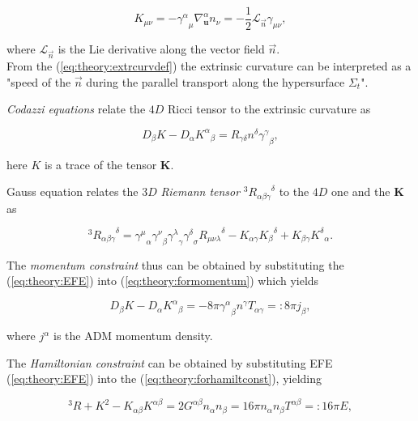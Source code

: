 \begin{equation}
K_{\mu\nu} = -{\gamma^{\alpha}}_{\mu}\nabla_{\boldsymbol{u}}^{\alpha} n_{\nu} = -\frac{1}{2}\mathcal{L}_{\vec{n}}\gamma_{\mu\nu},
\label{eq:theory:extrcurvdef}
\end{equation}

where $\mathcal{L}_{\vec{n}}$ is the Lie derivative along the vector field $\vec{n}$. \\
From the (\ref{eq:theory:extrcurvdef}) the extrinsic curvature can be interpreted as a "speed of the $\vec{n}$ during the parallel transport along the hypersurface $\Sigma_t$".

\textit{Codazzi equations} relate the $4D$ Ricci tensor to the extrinsic curvature as

\begin{equation}
D_{\beta}K-D_{\alpha}{K^{\alpha}}_{\beta}=R_{\gamma\delta}n^{\delta}{\gamma^{\gamma}}_{\beta},
\label{eq:theory:formomentum}
\end{equation}

here $K$ is a trace of the tensor $\boldsymbol{K}$.

Gauss equation relates the $3D$ \textit{Riemann tensor} $^3{R_{\alpha\beta\gamma}}^{\delta}$ to the $4D$ one and the $\boldsymbol{K}$ as 

\begin{equation}
^3{R_{\alpha\beta\gamma}}^{\delta} = {\gamma^{\mu}}_{\alpha}{\gamma^{\nu}}_{\beta}{\gamma^{\lambda}}_{\gamma}{\gamma^{\delta}}_{\sigma}{R_{\mu\nu\lambda}}^{\delta}-K_{\alpha\gamma}{K_{\beta}}^{\delta}+K_{\beta\gamma}{K^{\delta}}_{\alpha}.
\label{eq:theory:forhamiltconst}
\end{equation}

The \textit{momentum constraint} thus can be obtained by substituting the (\ref{eq:theory:EFE}) into  (\ref{eq:theory:formomentum}) which yields

\begin{equation}
D_{\beta}K-D_{\alpha}{K^{\alpha}}_{\beta} = -8\pi{\gamma^{\alpha}}_{\beta} n^{\gamma}T_{\alpha\gamma}=:8\pi j_{\beta},
\label{eq:theory:momconstraint}
\end{equation}

where $j^{\alpha}$ is the ADM momentum density.

The \textit{Hamiltonian constraint} can be obtained by substituting EFE (\ref{eq:theory:EFE}) into the (\ref{eq:theory:forhamiltconst}), yielding 

\begin{equation}
^3 R+ K^2 - K_{\alpha\beta}K^{\alpha\beta} = 2G^{\alpha\beta}n_{\alpha}n_{\beta} = 16\pi n_{\alpha}n_{\beta} T^{\alpha\beta} =: 16\pi E,
\label{eq:theory:hamilconstraint}
\end{equation}

